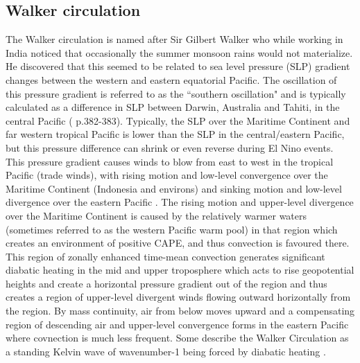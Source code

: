 \documentclass[letterpaper,12pt,titlepage,oneside,final]{book}
\begin{document}
\subsection{Walker circulation}\label{WC}

The Walker circulation is named after Sir Gilbert Walker who while working in India noticed that occasionally the summer monsoon rains would not materialize. He discovered that this seemed to be related to sea level pressure (SLP) gradient changes between the western and eastern equatorial Pacific. The oscillation of this pressure gradient is referred to as the ``southern oscillation" and is typically calculated as a difference in SLP between Darwin, Australia and Tahiti, in the central Pacific (\citep{holton_introduction_2004} p.382-383). Typically, the SLP over the Maritime Continent and far western tropical Pacific is lower than the SLP in the central/eastern Pacific, but this pressure difference can shrink or even reverse during El Nino events. This pressure gradient causes winds to blow from east to west in the tropical Pacific (trade winds), with rising motion and low-level convergence over the Maritime Continent (Indonesia and environs) and sinking motion and low-level divergence over the eastern Pacific \citep{bjerknes_atmospheric_1969}. The rising motion and upper-level divergence over the Maritime Continent is caused by the relatively warmer waters (sometimes referred to as the western Pacific warm pool) in that region which creates an environment of positive CAPE, and thus convection is favoured there. This region of zonally enhanced time-mean convection generates significant diabatic heating in the mid and upper troposphere which acts to rise geopotential heights and create a horizontal pressure gradient out of the region and thus creates a region of upper-level divergent winds flowing outward horizontally from the region. By mass continuity, air from below moves upward and a compensating region of descending air and upper-level convergence forms in the eastern Pacific where covnection is much less frequent. Some describe the Walker Circulation as a standing Kelvin wave of wavenumber-1 being forced by diabatic heating \citep{stechmann_walker_2014}. 
\end{document}
